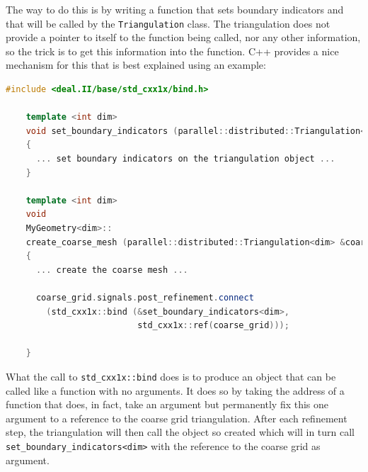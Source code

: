 \documentclass{article}
\begin{document}
The way to do this is by writing a function that sets boundary
indicators and that will be called by the \texttt{Triangulation} class. The
triangulation does not provide a pointer to itself to the function being
called, nor any other information, so the trick is to get this information
into the function. C++ provides a nice mechanism for this that is best
explained using an example:
\begin{lstlisting}[frame=single,language=C++]
    #include <deal.II/base/std_cxx1x/bind.h>

    template <int dim>
    void set_boundary_indicators (parallel::distributed::Triangulation<dim> &triangulation)
    {
      ... set boundary indicators on the triangulation object ...
    }

    template <int dim>
    void
    MyGeometry<dim>::
    create_coarse_mesh (parallel::distributed::Triangulation<dim> &coarse_grid) const
    {
      ... create the coarse mesh ...

      coarse_grid.signals.post_refinement.connect
        (std_cxx1x::bind (&set_boundary_indicators<dim>,
                          std_cxx1x::ref(coarse_grid)));

    }
\end{lstlisting}

What the call to \texttt{std\_cxx1x::bind} does is to produce an object that
can be called like a function with no arguments. It does so by taking the
address of a function that does, in fact, take an argument but permanently fix
this one argument to a reference to the coarse grid triangulation. After each
refinement step, the triangulation will then call the object so created which
will in turn call \texttt{set\_boundary\_indicators<dim>} with the reference
to the coarse grid as argument.
\end{document}
